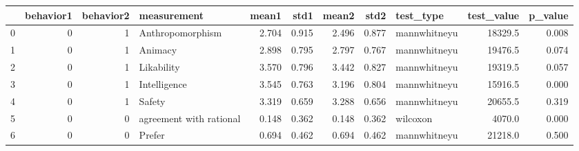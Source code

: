\begin{tabular}{lrrlrrrrlrr}
\toprule
{} &  behavior1 &  behavior2 &              measurement &  mean1 &   std1 &  mean2 &   std2 &     test\_type &  test\_value &  p\_value \\
\midrule
0 &          0 &          1 &         Anthropomorphism &  2.704 &  0.915 &  2.496 &  0.877 &  mannwhitneyu &     18329.5 &    0.008 \\
1 &          0 &          1 &                  Animacy &  2.898 &  0.795 &  2.797 &  0.767 &  mannwhitneyu &     19476.5 &    0.074 \\
2 &          0 &          1 &               Likability &  3.570 &  0.796 &  3.442 &  0.827 &  mannwhitneyu &     19319.5 &    0.057 \\
3 &          0 &          1 &             Intelligence &  3.545 &  0.763 &  3.196 &  0.804 &  mannwhitneyu &     15916.5 &    0.000 \\
4 &          0 &          1 &                   Safety &  3.319 &  0.659 &  3.288 &  0.656 &  mannwhitneyu &     20655.5 &    0.319 \\
5 &          0 &          0 &  agreement with rational &  0.148 &  0.362 &  0.148 &  0.362 &      wilcoxon &      4070.0 &    0.000 \\
6 &          0 &          0 &                   Prefer &  0.694 &  0.462 &  0.694 &  0.462 &  mannwhitneyu &     21218.0 &    0.500 \\
\bottomrule
\end{tabular}
